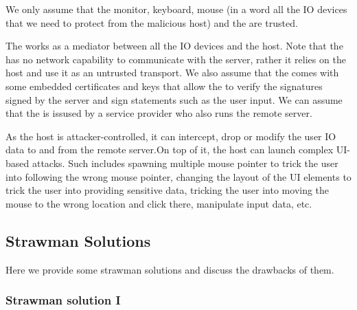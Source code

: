 We only assume that the monitor, keyboard, mouse (in a word all the IO devices that we need to protect from the malicious host) and the \device are trusted.

The \device works as a mediator between all the IO devices and the host. Note that the \device has no network capability to communicate with the server, rather it relies on the host and use it as an untrusted transport. We also assume that the \device comes with some embedded certificates and keys that allow the \device to verify the signatures signed by the server and sign statements such as the user input. We can assume that the \device is issused by a service provider who also runs the remote server.

 As the host is attacker-controlled, it can intercept, drop or modify the user IO data to and from the remote server.On top of it, the host can launch complex UI-based attacks. Such includes spawning multiple mouse pointer to trick the user into following the wrong mouse pointer, changing the layout of the UI elements to trick the user into providing sensitive data, tricking the user into moving the mouse to the wrong location and click there, manipulate input data, etc.

\iffalse
\begin{figure}[t]
\centering
\texttt{[image: screenPartition.pdf]}
\caption{\textbf{\device's pointer tracking, pointer \& UI overlay, and security properties.} Our proposed method provides two layers of protection for IO to the user. 1. In all the parts of the screen, the \device provide pointer integrity (the gray part). 2. The green part of the screen where the \device overlays on the HDMI stream where the \device provide integrity and privacy (privacy is dependent on the application requirements) for the IO.}
\spacesave
\label{fig:screenPartition}
\centering
\end{figure}
\fi


\subsection{Strawman Solutions}
\label{sec:approach:strawman}

Here we provide some strawman solutions and discuss the drawbacks of them.

\subsubsection{\bfseries Strawman solution I}
\label{sec:approach:strawman:1}

